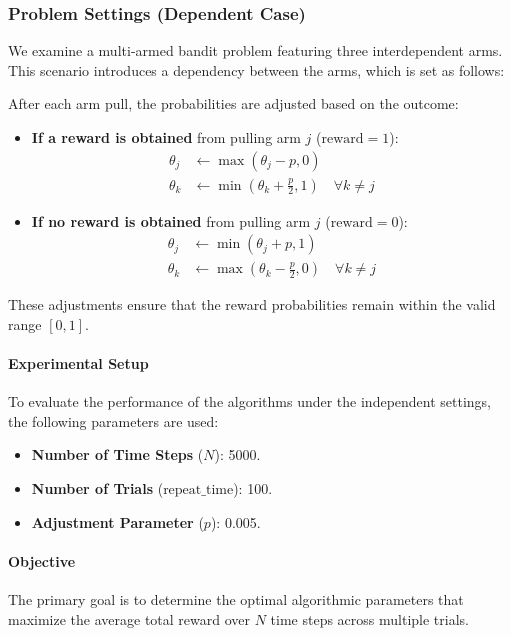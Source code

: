 \documentclass[11pt]{article}
\begin{document}
\subsubsection*{Problem Settings (Dependent Case)}
We examine a multi-armed bandit problem featuring three interdependent arms. This scenario introduces a dependency between the arms, which is set as follows:

After each arm pull, the probabilities are adjusted based on the outcome:
\begin{itemize}
    \item \textbf{If a reward is obtained} from pulling arm \(j\) (\(\text{reward} = 1\)):
    \begin{align*}
        \theta_j &\leftarrow \max(\theta_j - p, 0) \\
        \theta_k &\leftarrow \min(\theta_k + \frac{p}{2}, 1) \quad \forall k \neq j
    \end{align*}
    
    \item \textbf{If no reward is obtained} from pulling arm \(j\) (\(\text{reward} = 0\)):
    \begin{align*}
        \theta_j &\leftarrow \min(\theta_j + p, 1) \\
        \theta_k &\leftarrow \max(\theta_k - \frac{p}{2}, 0) \quad \forall k \neq j
    \end{align*}
\end{itemize}
These adjustments ensure that the reward probabilities remain within the valid range \([0, 1]\).

\paragraph{Experimental Setup}
To evaluate the performance of the algorithms under the independent settings, the following parameters are used:

\begin{itemize}
    \item \textbf{Number of Time Steps} (\( N \)): 5000.
    \item \textbf{Number of Trials} (\( \text{repeat\_time} \)): 100.
    \item \textbf{Adjustment Parameter} (\( p \)): 0.005.
\end{itemize}

\paragraph{Objective}
The primary goal is to determine the optimal algorithmic parameters that maximize the average total reward over \( N \) time steps across multiple trials.
\end{document}
